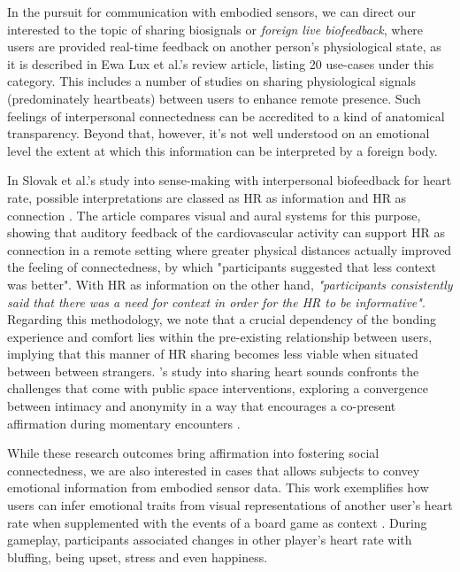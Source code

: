 In the pursuit for communication with embodied sensors, we can direct our interested to the topic of sharing biosignals or \textit{foreign live biofeedback}, where users are provided real-time feedback on another person's physiological state, as it is described in Ewa Lux et al.'s \cite{lux_live_2018} review article, listing 20 use-cases under this category. This includes a number of studies on sharing physiological signals (predominately heartbeats) between users to enhance remote presence. Such feelings of interpersonal connectedness can be accredited to a kind of anatomical transparency. Beyond that, however, it's not well understood on an emotional level the extent at which this information can be interpreted by a foreign body. 

In Slovak et al.'s study into sense-making with interpersonal biofeedback for heart rate, possible interpretations are classed as HR as information and HR as connection \cite{slovak_understanding_2012}. The article compares visual and aural systems for this purpose, showing that auditory feedback of the cardiovascular activity can support HR as connection in a remote setting where greater physical distances actually improved the feeling of connectedness, by which "participants suggested that less context was better". With HR as information on the other hand, \textit{"participants consistently said that there was a need for context in order for the HR to be informative"}. Regarding this methodology, we note that a crucial dependency of the bonding experience and comfort lies within the pre-existing relationship between users, implying that this manner of HR sharing becomes less viable when situated between between strangers. \citeauthor{howell_life-affirming_2019}'s study into sharing heart sounds confronts the challenges that come with public space interventions, exploring a convergence between intimacy and anonymity in a way that encourages a co-present affirmation during momentary encounters \cite{howell_life-affirming_2019}.

While these research outcomes bring affirmation into fostering social connectedness, we are also interested in cases that allows subjects to convey emotional information from embodied sensor data. This work exemplifies how users can infer emotional traits from visual representations of another user's heart rate when supplemented with the events of a board game as context \cite{frey_remote_2016}. During gameplay, participants associated changes in other player's heart rate with bluffing, being upset, stress and even happiness. 

